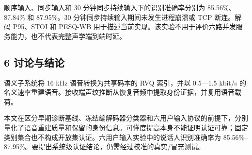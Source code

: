 \documentclass[12pt]{article}
\begin{document}
顺序输入、同步输入和 30 分钟同步持续输入下的识别准确率分别为 85.56\%、87.84\% 和 87.95\%。30 分钟同步持续输入期间未发生进程崩溃或 TCP 断连。解码 P95、STOI 和 PESQ-WB 用于描述当前实现。该实验不用于评价六路并发服务能力，也不代表完整声学端到端时延。

\subsection{6 讨论与结论}\label{ux8ba8ux8bbaux4e0eux7ed3ux8bba}

语义子系统将 16 kHz 语音转换为共享码本的 RVQ 索引，并以 0.5---1.5 kbit/s
的名义速率重建语音。接收端声纹推断从恢复音频中提取身份证据，并复用语音载荷。

本文在区分早期诊断基线、冻结编解码器分类器和六用户输入协议的前提下，分别量化了语音重建质量和保留的身份信息。可懂度提高本身不能证明认证可靠；固定类别集合也不构成开放集认证。六用户输入实验中的说话人识别准确率为 85.56\%--87.95\%。要提出系统级认证结论，仍需经过校准的真实/冒充测试。
\end{document}
